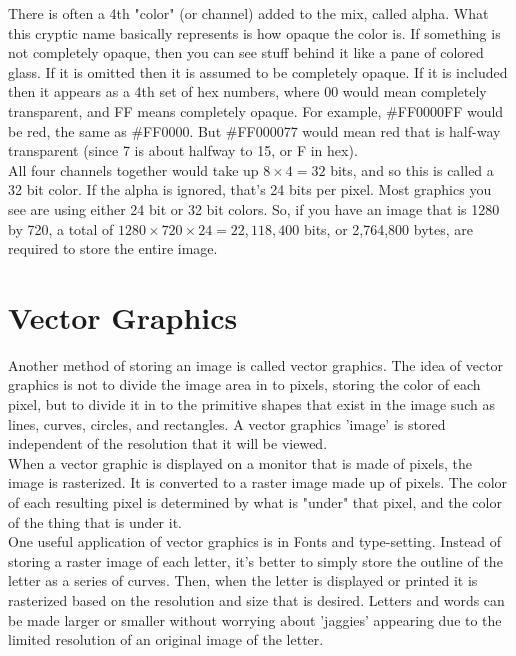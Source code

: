 There is often a 4th "color" (or channel) added to the mix, called alpha. What this cryptic name basically represents is how opaque the color is. If something is not completely opaque, then you can see stuff behind it like a pane of colored glass. If it is omitted then it is assumed to be completely opaque. If it is included then it appears as a 4th set of hex numbers, where 00 would mean completely transparent, and FF means completely opaque. For example, \#FF0000FF would be red, the same as \#FF0000. But \#FF000077 would mean red that is half-way transparent (since 7 is about halfway to 15, or F in hex).\\

All four channels together would take up \(8\times 4 = 32 \) bits, and so this is called a 32 bit color. If the alpha is ignored, that's 24 bits per pixel. Most graphics you see are using either 24 bit or 32 bit colors.  So, if you have an image that is 1280 by 720, a total of \(1280\times720\times24 = 22,118,400\) bits, or 2,764,800 bytes, are required to store the entire image.\\



\section{Vector Graphics}

Another method of storing an image is called vector graphics. The idea of vector graphics is not to divide the image area in to pixels, storing the color of each pixel, but to divide it in to the primitive shapes that exist in the image such as lines, curves, circles, and rectangles. A vector graphics 'image' is stored independent of the resolution that it will be viewed.\\

When a vector graphic is displayed on a monitor that is made of pixels, the image is rasterized. It is converted to a raster image made up of pixels. The color of each resulting pixel is determined by what is "under" that pixel, and the color of the thing that is under it.\\

One useful application of vector graphics is in Fonts and type-setting. Instead of storing a raster image of each letter, it's better to simply store the outline of the letter as a series of curves. Then, when the letter is displayed or printed it is rasterized based on the resolution and size that is desired. Letters and words can be made larger or smaller without worrying about 'jaggies' appearing due to the limited resolution of an original image of the letter.\\

